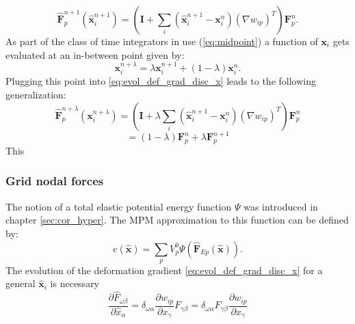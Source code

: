 \documentclass[m,times]{cgMA}
\begin{document}
\begin{equation}\label{eq:evol_def_grad_disc_x}
  \boldsymbol{\hat{F}}^{n+1}_p(\boldsymbol{\hat{x}}_i^{n+1}) =  \left( \boldsymbol{I} + \sum_i (\boldsymbol{\hat{x}}_i^{n+1} - \boldsymbol{x}_i^{n})({\nabla w_{ip}})^T \right)\boldsymbol{F}^{n}_p.
\end{equation}
As part of the class of time integrators in use (\ref{eq:midpoint}) a function of $\boldsymbol{x}_i$ gets evaluated at an in-between point given by:
\begin{equation}\label{eq:midpoint_x}
  \boldsymbol{x}_i^{n+\lambda} = \lambda \boldsymbol{x}_i^{n+1} + (1-\lambda)\boldsymbol{x}_i^n.
\end{equation}
Plugging this point into \ref{eq:evol_def_grad_disc_x} leads to the following generalization:
$$\boldsymbol{\hat{F}}^{n+\lambda}_p(\boldsymbol{x}_i^{n+\lambda}) = \left( \boldsymbol{I} + \lambda \sum_i (\boldsymbol{\hat{x}}_i^{n+1} - \boldsymbol{x}_i^{n})({\nabla w_{ip}})^T \right)\boldsymbol{F}^{n}_p
  $$
  \begin{equation} \label{eq:def_grad_lambda}
  = (1-\lambda)\boldsymbol{F}^n_p + \lambda \boldsymbol{F}^{n+1}_p
\end{equation}
This
\cite{MPM:COURSE}
\subsubsection{Grid nodal forces}
The notion of a total elastic potential energy function $\Psi$ was introduced in chapter \ref{sec:cor_hyper}. The MPM approximation to this function can be defined by:
\begin{equation}\label{eq:energy_discr}
  e(\hat{\boldsymbol{x}}) = \sum_pV^0_p \Psi(\hat{\boldsymbol{F}}_{Ep}(\hat{\boldsymbol{x}})).
\end{equation}
The evolution of the deformation gradient \ref{eq:evol_def_grad_disc_x} for a general $\boldsymbol{\hat{x}}_i$  is necessary
\begin{equation}\label{eq:partial_def_grad}
\frac{\partial \hat{F}_{\omega\beta}}{\partial \hat{x}_\alpha}
= \delta_{\omega \alpha}
\frac{\partial w_{ip}}{\partial x_\gamma}F_{\gamma\beta} = \delta_{\omega \alpha}F_{\gamma\beta} \frac{\partial{w_{ip}}}{\partial x_\gamma}
\end{equation}
\end{document}

